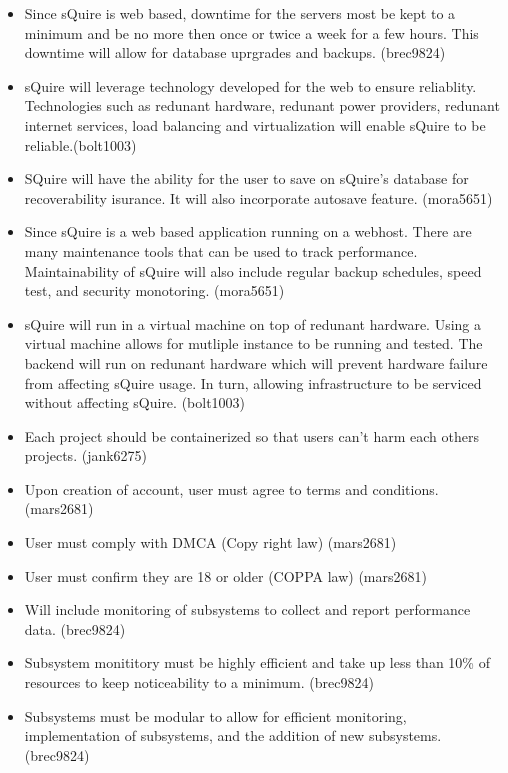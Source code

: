 \documentclass[11pt]{report}
\begin{document}
\begin{itemize}
        \item Since sQuire is web based, downtime for the servers most be kept to a minimum and be no more then once or twice a week for a few hours. This downtime will allow for database uprgrades and backups. (brec9824)
        \item sQuire will leverage technology developed for the web to ensure reliablity. Technologies such as redunant hardware, redunant power providers, redunant internet services, load balancing and virtualization will enable sQuire to be reliable.(bolt1003)
        \item SQuire will have the ability for the user to save on sQuire's database for recoverability isurance. It will also incorporate autosave feature. (mora5651)
        \item Since sQuire is a web based application running on a webhost. There are 
        many maintenance tools that can be used to track performance. Maintainability of sQuire will also include regular backup schedules, speed test, and security monotoring. (mora5651)
        \item sQuire will run in a virtual machine on top of redunant hardware. Using a virtual machine allows for mutliple instance to be running and tested. The backend will run on redunant hardware which will prevent hardware failure from affecting sQuire usage. In turn, allowing infrastructure to be serviced without affecting sQuire. (bolt1003)
        \item Each project should be containerized so that users can't harm each others projects. (jank6275)
        \item Upon creation of account, user must agree to terms and conditions. (mars2681)
        \item User must comply with DMCA (Copy right law) (mars2681)
        \item User must confirm they are 18 or older (COPPA law) (mars2681)
        \item Will include monitoring of subsystems to collect and report performance data. (brec9824)
        \item Subsystem monititory must be highly efficient and take up less than 10\% of resources to keep noticeability to a minimum. (brec9824)
        \item Subsystems must be modular to allow for efficient monitoring, implementation of subsystems, and the addition of new subsystems. (brec9824)

\end{itemize}
\end{document}
